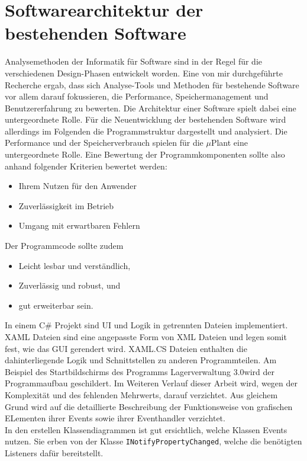 

\chapter{Softwarearchitektur der bestehenden Software}

    Analysemethoden der Informatik für Software sind in der Regel für die verschiedenen Design-Phasen entwickelt worden.
    Eine von mir durchgeführte Recherche ergab, dass sich Analyse-Tools und Methoden für bestehende Software vor
    allem darauf fokussieren, die Performance, Speichermanagement und Benutzererfahrung zu bewerten.
    Die Architektur einer Software spielt dabei eine untergeordnete Rolle.
    Für die Neuentwicklung der bestehenden Software wird allerdings im Folgenden die Programmstruktur dargestellt und analysiert.
    Die Performance und der Speicherverbrauch spielen für die $\mu$Plant eine untergeordnete Rolle.
    Eine Bewertung der Programmkomponenten sollte also anhand folgender Kriterien bewertet werden:

    \begin{itemize}
        \item Ihrem Nutzen für den Anwender
        \item Zuverlässigkeit im Betrieb
        \item Umgang mit erwartbaren Fehlern
    \end{itemize}

    Der Programmcode sollte zudem
    \begin{itemize}
        \item Leicht lesbar und verständlich,
        \item Zuverlässig und robust, und
        \item gut erweiterbar sein.
    \end{itemize}
    In einem C$\#$ Projekt sind UI und Logik in getrennten Dateien implementiert.
    XAML Dateien sind eine angepasste Form von XML Dateien und legen somit fest, wie das GUI gerendert wird.
    XAML.CS Dateien enthalten die dahinterliegende Logik und Schnittstellen zu anderen Programmteilen.
    Am Beispiel des Startbildschirms des Programms \glqq Lagerverwaltung 3.0\grqq wird der Programmaufbau geschildert.
    Im Weiteren Verlauf dieser Arbeit wird, wegen der Komplexität und des fehlenden Mehrwerts, darauf verzichtet.
    Aus gleichem Grund wird auf die detaillierte Beschreibung der Funktionsweise von grafischen ELementen ihrer Events
    sowie ihrer Eventhandler verzichtet.
    \\
    In den erstellen Klassendiagrammen ist gut ersichtlich, welche Klassen Events nutzen.
    Sie erben von der Klasse \verb|INotifyPropertyChanged|, welche die benötigten Listeners dafür bereitstellt.

